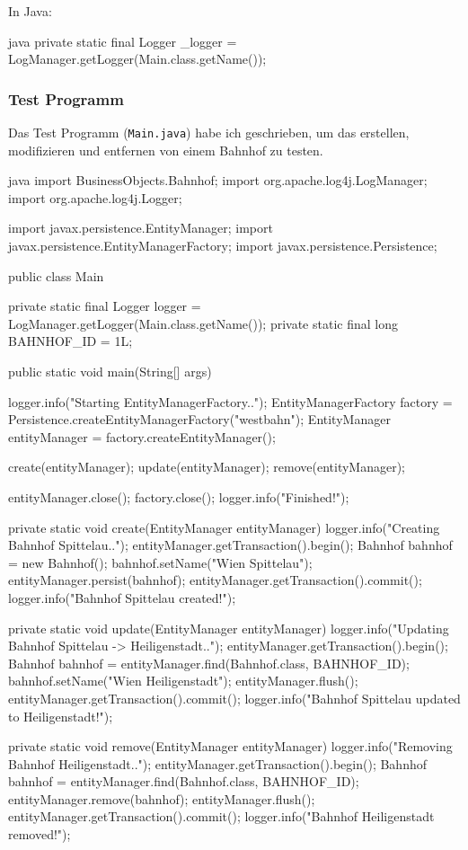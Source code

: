 In Java:

\begin{code}{java}
private static final Logger _logger = LogManager.getLogger(Main.class.getName());
\end{code}

\subsubsection{Test Programm}

Das Test Programm (\texttt{Main.java}) habe ich geschrieben, um das erstellen, modifizieren und entfernen von einem Bahnhof zu testen.

\begin{code}{java}
import BusinessObjects.Bahnhof;
import org.apache.log4j.LogManager;
import org.apache.log4j.Logger;

import javax.persistence.EntityManager;
import javax.persistence.EntityManagerFactory;
import javax.persistence.Persistence;

public class Main {
    private static final Logger logger = LogManager.getLogger(Main.class.getName());
    private static final long BAHNHOF_ID = 1L;

    public static void main(String[] args) {
        logger.info("Starting EntityManagerFactory..");
        EntityManagerFactory factory = Persistence.createEntityManagerFactory("westbahn");
        EntityManager entityManager = factory.createEntityManager();

        create(entityManager);
        update(entityManager);
        remove(entityManager);

        entityManager.close();
        factory.close();
        logger.info("Finished!");
    }

    private static void create(EntityManager entityManager) {
        logger.info("Creating Bahnhof Spittelau..");
        entityManager.getTransaction().begin();
        Bahnhof bahnhof = new Bahnhof();
        bahnhof.setName("Wien Spittelau");
        entityManager.persist(bahnhof);
        entityManager.getTransaction().commit();
        logger.info("Bahnhof Spittelau created!");
    }

    private static void update(EntityManager entityManager) {
        logger.info("Updating Bahnhof Spittelau -> Heiligenstadt..");
        entityManager.getTransaction().begin();
        Bahnhof bahnhof = entityManager.find(Bahnhof.class, BAHNHOF_ID);
        bahnhof.setName("Wien Heiligenstadt");
        entityManager.flush();
        entityManager.getTransaction().commit();
        logger.info("Bahnhof Spittelau updated to Heiligenstadt!");
    }

    private static void remove(EntityManager entityManager) {
        logger.info("Removing Bahnhof Heiligenstadt..");
        entityManager.getTransaction().begin();
        Bahnhof bahnhof = entityManager.find(Bahnhof.class, BAHNHOF_ID);
        entityManager.remove(bahnhof);
        entityManager.flush();
        entityManager.getTransaction().commit();
        logger.info("Bahnhof Heiligenstadt removed!");
    }
}
\end{code}

